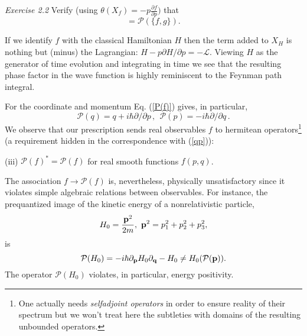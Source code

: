 {\it Exercise 2.2} Verify (using $\theta(X_f) = 
-p\frac{\partial f}{\partial p})$ that
\begin{equation}
[{\mathcal P}(f), {\mathcal P}(g)] = {\mathcal P}(\{f, g\}).
\end{equation}

If we identify $f$ with the classical Hamiltonian $H$ then the term added to
$X_H$ is nothing but (minus) the Lagrangian: $H - p\partial{H}/\partial{p} =
-\mathcal{L}$. Viewing $H$ as the generator of time evolution and integrating in
 time we see that the resulting phase factor in the wave function is highly
reminiscent to the Feynman path integral.

For the coordinate and momentum Eq. (\ref{P(f)}) gives, in particular,
\begin{equation}
\label{Pqp}
{\mathcal P}(q) = q + i\hbar \partial/\partial{p}\,, \ \ {\mathcal P}(p) =
-i \hbar \partial/\partial{q}\,.
\end{equation}
We observe that our prescription sends real observables $f$ to hermitean
operators\footnote{One actually needs {\it selfadjoint operators} in order
to ensure reality of their spectrum but we won't treat here the subtleties
with domains of the resulting unbounded operators.} (a requirement hidden
in the correspondence with (\ref{qp})):

(iii) ${\mathcal P}(f)^* = {\mathcal P}(f)$ for real smooth functions $f(p, q)$.

The association $f \rightarrow {\mathcal P}(f)$ is,
nevertheless, physically unsatisfactory since it violates simple algebraic
relations between observables. For instance, the prequantized image of the
kinetic energy of a nonrelativistic particle,
\begin{equation}
\label{H0}
H_0 = \frac{{\bf p}^2}{2m}, \, \, {\bf p}^2 = p_1^2 + p_2^2 + p_3^2,
\end{equation}
is
\begin{equation}
\label{PH0}
{\mathcal P}(H_0) = -i\hbar {\bf \partial}_{\bf p} H_0 {\bf \partial}_{\bf q} -
H_0 \neq H_0({\mathcal P}({\bf p})).
\end{equation}
The operator ${\mathcal P}(H_0)$ violates, in particular, energy positivity.


